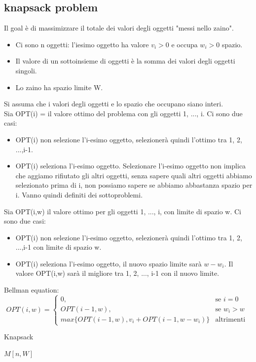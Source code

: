 \documentclass{article}
\begin{document}
\subsection{knapsack problem}
Il goal è di massimizzare il totale dei valori degli oggetti "messi nello zaino".
\begin{itemize}
    \item Ci sono n oggetti: l'iesimo oggetto ha valore $v_i>0$ e occupa $w_i>0$ spazio.
    \item Il valore di un sottoinsieme di oggetti è la somma dei valori degli oggetti singoli.
    \item Lo zaino ha spazio limite W.
\end{itemize}
Si assuma che i valori degli oggetti e lo spazio che occupano siano interi.\\
Sia OPT(i) = il valore ottimo del problema con gli oggetti 1, ..., i.
Ci sono due casi:
\begin{itemize}
    \item OPT(i) non selezione l'i-esimo oggetto, selezionerà quindi l'ottimo tra {1, 2, ...,i-1}.
    \item OPT(i) seleziona l'i-esimo oggetto. Selezionare l'i-esimo oggetto non implica che aggiamo rifiutato gli altri oggetti, senza sapere quali altri oggetti abbiamo selezionato prima di i, non possiamo sapere se abbiamo abbastanza spazio per i. Vanno quindi definiti dei sottoproblemi.
\end{itemize}
Sia OPT(i,w) il valore ottimo per gli oggetti 1, ..., i, con limite di spazio w. 
Ci sono due casi:
\begin{itemize}
    \item OPT(i) non selezione l'i-esimo oggetto, selezionerà quindi l'ottimo tra {1, 2, ...,i-1} con limite di spazio w.
    \item OPT(i) seleziona l'i-esimo oggetto, il nuovo spazio limite sarà $w - w_i$. Il valore OPT(i,w) sarà il migliore tra {1, 2, ..., i-1} con il nuovo limite.
\end{itemize}
Bellman equation:\\
\[
OPT(i, w) =\begin{cases} 0, & \mbox{se }i=0 \\ OPT(i-1,w), & \mbox{se }w_i>w \\ max\{OPT(i-1,w),v_i+OPT(i-1,w-w_i)\} & \mbox{altrimenti }
\end{cases}
\]
\begin{center}
\begin{algorithm}
\caption{Knapsack}
\Return $M[n,W]$\;
\end{algorithm}
\end{center}
\end{document}

